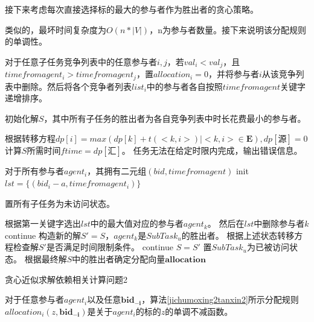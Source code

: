 \documentclass[promaster]{thesis-uestc}
\begin{document}
接下来考虑每次直接选择标的最大的参与者作为胜出者的贪心策略。

类似的，最坏时间复杂度为$O(n*|V|)$，n为参与者数量。接下来说明该分配规则的单调性。

\begin{algorithm}[p]
    对于任意子任务竞争列表中的任意参与者$i,j$，若$val_i < val_j$，且$timefromagent_i > timefromagent_j$，置$allocation_i = 0$，并将参与者$i$从该竞争列表中删除。然后将各个竞争者列表$list_i$中的参与者各自按照$timefromagent$关键字递增排序。\;

    初始化解$S$，其中所有子任务的胜出者为各自竞争列表中时长花费最小的参与者。\;
    
    根据转移方程$dp[i] = max(dp[k]+t(<k,i>)|<k,i> \in \mathbf{E}),dp[\text{源}] = 0$计算$S$所需时间$ftime = dp[\text{汇}]$。\;
    {
        任务无法在给定时限内完成，输出错误信息。\;
    }

    对于所有参与者$agent_i$，其拥有二元组$(bid,timefromagent)$\;
    init $lst =\{(bid_i-a,timefromagent_i)\}$\;

    置所有子任务为未访问状态。\;

    {
        根据第一关键字选出$lst$中的最大值对应的参与者$agent_k$。\;
        然后在$lst$中删除参与者$k$\;
        {
            continue\;
        }
        构造新的解$S' = S$，$agent_k$是$SubTask_u$的胜出者。\;
        根据上述状态转移方程检查解$S'$是否满足时间限制条件。\;
        {
            continue\;
        }
        $S=S'$\;
        置$SubTask_u$为已被访问状态。\;
    }
    根据最终解$S$中的胜出者确定分配向量$\mathbf{allocation}$\;
\caption{贪心近似求解依赖相关计算问题2}
\label{jichumoxing2tanxin2}
\end{algorithm}

\begin{theorem}
对于任意参与者$agent_i$以及任意$\mathbf{bid_{-i}}$，算法\ref{jichumoxing2tanxin2}所示分配规则$allocation_i(z,\mathbf{bid_{-i}})$是关于$agent_i$的标的$z$的单调不减函数。
\end{theorem}
\end{document}
